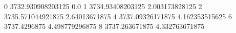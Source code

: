 0 3732.930908203125 0.0
1 3734.93408203125 2.003173828125
2 3735.571044921875 2.64013671875
4 3737.09326171875 4.162353515625
6 3737.4296875 4.498779296875
8 3737.263671875 4.332763671875

